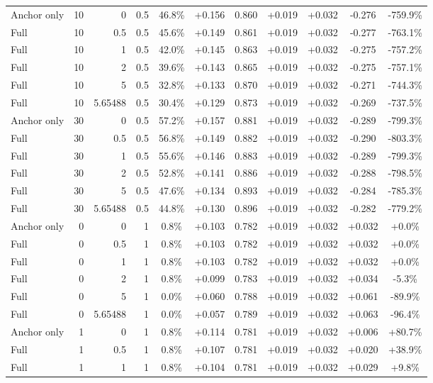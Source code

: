 \begin{table}[htbp]
\begin{tabular}{lrrrccccccc}
Anchor only & 10 & 0 & 0.5 & 46.8\% & +0.156 & 0.860 & +0.019 & +0.032 & -0.276 & -759.9\% \\
Full & 10 & 0.5 & 0.5 & 45.6\% & +0.149 & 0.861 & +0.019 & +0.032 & -0.277 & -763.1\% \\
Full & 10 & 1 & 0.5 & 42.0\% & +0.145 & 0.863 & +0.019 & +0.032 & -0.275 & -757.2\% \\
Full & 10 & 2 & 0.5 & 39.6\% & +0.143 & 0.865 & +0.019 & +0.032 & -0.275 & -757.1\% \\
Full & 10 & 5 & 0.5 & 32.8\% & +0.133 & 0.870 & +0.019 & +0.032 & -0.271 & -744.3\% \\
Full & 10 & 5.65488 & 0.5 & 30.4\% & +0.129 & 0.873 & +0.019 & +0.032 & -0.269 & -737.5\% \\
Anchor only & 30 & 0 & 0.5 & 57.2\% & +0.157 & 0.881 & +0.019 & +0.032 & -0.289 & -799.3\% \\
Full & 30 & 0.5 & 0.5 & 56.8\% & +0.149 & 0.882 & +0.019 & +0.032 & -0.290 & -803.3\% \\
Full & 30 & 1 & 0.5 & 55.6\% & +0.146 & 0.883 & +0.019 & +0.032 & -0.289 & -799.3\% \\
Full & 30 & 2 & 0.5 & 52.8\% & +0.141 & 0.886 & +0.019 & +0.032 & -0.288 & -798.5\% \\
Full & 30 & 5 & 0.5 & 47.6\% & +0.134 & 0.893 & +0.019 & +0.032 & -0.284 & -785.3\% \\
Full & 30 & 5.65488 & 0.5 & 44.8\% & +0.130 & 0.896 & +0.019 & +0.032 & -0.282 & -779.2\% \\
Anchor only & 0 & 0 & 1 & 0.8\% & +0.103 & 0.782 & +0.019 & +0.032 & +0.032 & +0.0\% \\
Full & 0 & 0.5 & 1 & 0.8\% & +0.103 & 0.782 & +0.019 & +0.032 & +0.032 & +0.0\% \\
Full & 0 & 1 & 1 & 0.8\% & +0.103 & 0.782 & +0.019 & +0.032 & +0.032 & +0.0\% \\
Full & 0 & 2 & 1 & 0.8\% & +0.099 & 0.783 & +0.019 & +0.032 & +0.034 & -5.3\% \\
Full & 0 & 5 & 1 & 0.0\% & +0.060 & 0.788 & +0.019 & +0.032 & +0.061 & -89.9\% \\
Full & 0 & 5.65488 & 1 & 0.0\% & +0.057 & 0.789 & +0.019 & +0.032 & +0.063 & -96.4\% \\
Anchor only & 1 & 0 & 1 & 0.8\% & +0.114 & 0.781 & +0.019 & +0.032 & +0.006 & +80.7\% \\
Full & 1 & 0.5 & 1 & 0.8\% & +0.107 & 0.781 & +0.019 & +0.032 & +0.020 & +38.9\% \\
Full & 1 & 1 & 1 & 0.8\% & +0.104 & 0.781 & +0.019 & +0.032 & +0.029 & +9.8\% \\

\end{tabular}
\end{table}
